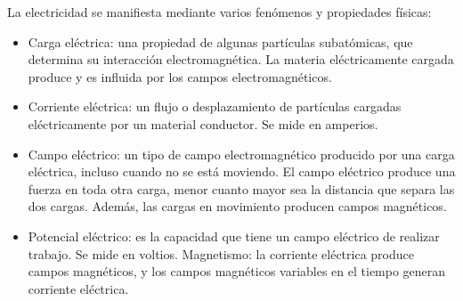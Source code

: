 \documentclass{article}
\begin{document}
La electricidad se manifiesta mediante varios fenómenos y propiedades físicas:\citep{Elec}


\begin{itemize}
   

     \item Carga eléctrica: una propiedad de algunas partículas subatómicas, que determina su interacción electromagnética. La materia eléctricamente cargada produce y es influida por los campos electromagnéticos.\citep{Elec}
     
     \item Corriente eléctrica: un flujo o desplazamiento de partículas cargadas eléctricamente por un material conductor. Se mide en amperios.\citep{Elec}
     
     \item Campo eléctrico: un tipo de campo electromagnético producido por una carga eléctrica, incluso cuando no se está moviendo. El campo eléctrico produce una fuerza en toda otra carga, menor cuanto mayor sea la distancia que separa las dos cargas. Además, las cargas en movimiento producen campos magnéticos.\citep{Elec}
     
     \item Potencial eléctrico: es la capacidad que tiene un campo eléctrico de realizar trabajo. Se mide en voltios.
    Magnetismo: la corriente eléctrica produce campos magnéticos, y los campos magnéticos variables en el tiempo generan corriente eléctrica.\citep{Elec}

\end{itemize}



 
 
 
 
 
 
 
 
\end{document}
